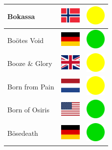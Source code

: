 \documentclass[12pt, a4paper, twoside]{report}
\begin{document}
\begin{center}
\begin{longtable}{|p{5cm}|p{2cm}|p{2cm}|}
 Bokassa                                                    & \includegraphics[width=1cm]{../img/flags/no} &   \includegraphics[width=1cm]{../likes/m} \\ \hline
 Boötes Void                                                & \includegraphics[width=1cm]{../img/flags/de} &   \includegraphics[width=1cm]{../likes/y} \\ \hline
 Booze \& Glory                                             & \includegraphics[width=1cm]{../img/flags/gb} &   \includegraphics[width=1cm]{../likes/m} \\ \hline
 Born from Pain                                             & \includegraphics[width=1cm]{../img/flags/nl} &   \includegraphics[width=1cm]{../likes/m} \\ \hline
 Born of Osiris                                             & \includegraphics[width=1cm]{../img/flags/us} &   \includegraphics[width=1cm]{../likes/y} \\ \hline
 Bösedeath                                                  & \includegraphics[width=1cm]{../img/flags/de} &   \includegraphics[width=1cm]{../likes/y} \\ \hline

\end{longtable}
\end{center}
\end{document}
